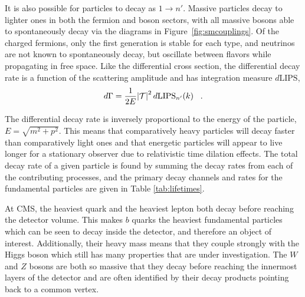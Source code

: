 
 It is also possible for particles to decay
  as $1\rightarrow n'$.
 Massive particles decay to lighter ones
  in both the fermion and boson sectors,
  with all massive bosons able to 
  spontaneously decay via the diagrams in
  Figure~\ref{fig:smcouplings}.
 Of the charged fermions, only the first
  generation is stable for each type, and
  neutrinos are not known to spontaneously
  decay, but oscillate between flavors
  while propagating in free space.
 Like the differential cross section,
  the differential decay rate is a function
  of the scattering amplitude and
  has integration measure $d\mathrm{LIPS}$, 
\begin{equation}\label{eq:diffdecayrate}
 d\Gamma = \frac{1}{2E}\abs{\mathcal{T}}^2d\mathrm{LIPS}_{n'}(k)\;\;\;.
\end{equation}

 The differential decay rate is 
  inversely proportional to the energy
  of the particle, $E=\sqrt{m^2 + p^2}$.
 This means that
  comparatively heavy particles will decay
  faster than comparatively light ones
  and that energetic particles
  will appear to live longer 
  for a stationary observer due to
  relativistic time dilation effects.
 The total decay rate of a given particle
  is found by summing the decay rates from
  each of the contributing processes,
  and the primary decay channels and rates
  for the fundamental particles
  are given in Table \ref{tab:lifetimes}.

 At CMS, the heaviest quark and the heaviest
  lepton both decay before reaching
  the detector volume.
 This makes $b$ quarks the heaviest
  fundamental particles which can be seen
  to decay inside the detector,
  and therefore an object of interest.
 Additionally, their heavy mass means that they
  couple strongly with the Higgs boson
  which still has many properties that
  are under investigation.
 The $W$ and $Z$ bosons are both so 
  massive that they decay before reaching
  the innermost layers of the detector
  and are often identified by their decay products
  pointing back to a common vertex.
 
